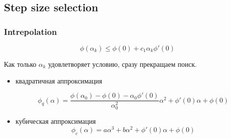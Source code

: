\subsection{Step size selection}

\begin{frame}
  \frametitle{Intrepolation}
    \begin{equation*}
      \phi (\alpha_k) \leq \phi(0) + c_1 \alpha_k \phi'(0)
    \end{equation*}

    Как только $\alpha_k$ удовлетворяет условию, сразу прекращаем поиск.
    \begin{itemize}
    \item квадратичная аппроксимация

    \begin{equation*}
      \phi_q(\alpha) = \frac{\phi(\alpha_0) - \phi(0) - \alpha_0 \phi'(0)}{\alpha_0^2} \alpha^2 + \phi'(0) \alpha + \phi(0)
    \end{equation*}

    \item кубическая аппроксимация
      \begin{equation*}
        \phi_c(\alpha) = a \alpha^3 + b \alpha^2 + \phi'(0) \alpha + \phi(0)
      \end{equation*}
  \end{itemize}
\end{frame}

